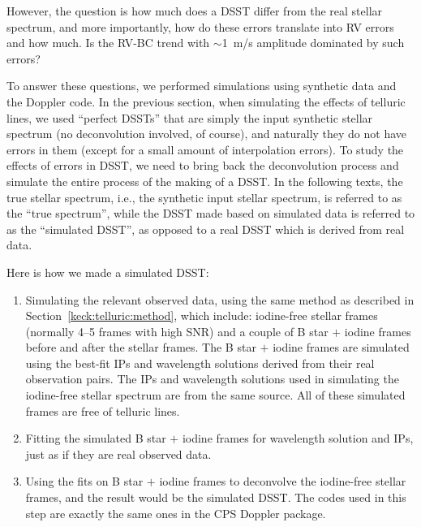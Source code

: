 However, the question is how much does a DSST differ from the real
stellar spectrum, and more importantly, how do these errors translate
into RV errors and how much. Is the RV-BC trend with $\sim$1~m/s
amplitude dominated by such errors?

To answer these questions, we performed simulations using synthetic
data and the Doppler code. In the previous section, when simulating
the effects of telluric lines, we used ``perfect DSSTs'' that are
simply the input synthetic stellar spectrum (no deconvolution
involved, of course), and naturally they do not have errors in them
(except for a small amount of interpolation errors). To study the
effects of errors in DSST, we need to bring back the deconvolution
process and simulate the entire process of the making of a DSST. In
the following texts, the true stellar spectrum, i.e., the synthetic
input stellar spectrum, is referred to as the ``true spectrum'', while
the DSST made based on simulated data is referred to as the
``simulated DSST'', as opposed to a real DSST which is derived from
real data.

Here is how we made a simulated DSST:
\begin{enumerate}
  \item Simulating the relevant observed data, using the same method
    as described in Section~\ref{keck:telluric:method}, which include:
    iodine-free stellar frames (normally 4--5 frames with high SNR) and a
    couple of B star $+$ iodine frames before and after the stellar
    frames. The B star $+$ iodine frames are simulated using the best-fit
    IPs and wavelength solutions derived from their real observation
    pairs. The IPs and wavelength solutions used in simulating the
    iodine-free stellar spectrum are from the same source. All of these
    simulated frames are free of telluric lines.
  \item Fitting the simulated B star $+$ iodine frames for wavelength
    solution and IPs, just as if they are real observed data.
  \item Using the fits on B star $+$ iodine frames to deconvolve the
    iodine-free stellar frames, and the result would be the simulated
    DSST. The codes used in this step are exactly the same ones in the
    CPS Doppler package.
\end{enumerate}

